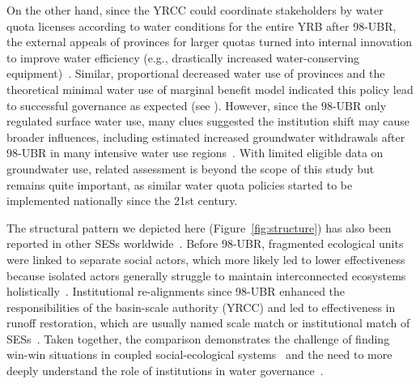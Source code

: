 \documentclass[preprint, 12pt]{elsarticle}
\begin{document}
On the other hand, since the YRCC could coordinate stakeholders by water quota licenses according to water conditions for the entire YRB after 98-UBR, the external appeals of provinces for larger quotas turned into internal innovation to improve water efficiency (e.g., drastically increased water-conserving equipment)~\cite{krieger1955, ostrom1990}.
Similar, proportional decreased water use of provinces and the theoretical minimal water use of marginal benefit model indicated this policy lead to successful governance as expected (see ).
However, since the 98-UBR only regulated surface water use, many clues suggested the institution shift may cause broader influences, including estimated increased groundwater withdrawals after 98-UBR in many intensive water use regions~\cite{sun2022b}.
With limited eligible data on groundwater use, related assessment is beyond the scope of this study but remains quite important, as similar water quota policies started to be implemented nationally since the 21st century.

The structural pattern we depicted here (Figure~\ref{fig:structure}) has also been reported in other SESs worldwide~\cite{kluger2020,guerrero2015,bodin2012}.
Before 98-UBR, fragmented ecological units were linked to separate social actors, which more likely led to lower effectiveness because isolated actors generally struggle to maintain interconnected ecosystems holistically~\cite{sayles2017,sayles2019,cai2016,bergsten2019}.
Institutional re-alignments since 98-UBR enhanced the responsibilities of the basin-scale authority (YRCC) and led to effectiveness in runoff restoration, which are usually named scale match or institutional match of SESs~\cite{cumming2020a,wang2019d}.
Taken together, the comparison demonstrates the challenge of finding win-win situations in coupled social-ecological systems~\cite{hegwood2022} and the need to more deeply understand the role of institutions in water governance~\cite{bergsten2019, sayles2019}.
\end{document}
